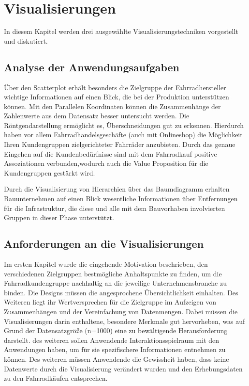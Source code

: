 \documentclass[usegeometry=true]{scrartcl}
\begin{document}
\section{Visualisierungen}
In diesem Kapitel werden drei ausgewählte Visualisierungstechniken vorgestellt und diskutiert.
\subsection{Analyse der Anwendungsaufgaben}
Über den Scatterplot erhält besonders die Zielgruppe der Fahrradhersteller wichtige Informationen auf einen Blick, die bei der Produktion unterstützen können. 
Mit den Parallelen Koordinaten können die Zusammenhänge der Zahlenwerte aus dem Datensatz besser untersucht werden. Die Röntgendarstellung ermöglicht es, Überschneidungen gut zu erkennen. Hierdurch haben vor allem Fahrradhandelsgeschäfte (auch mit Onlineshop) die Möglichkeit Ihren Kundengruppen zielgerichteter Fahrräder anzubieten.
Durch das genaue Eingehen auf die Kundenbedürfnisse sind mit dem Fahrradkauf positive Assoziationen verbunden,wodurch auch die Value Proposition für die Kundengruppen gestärkt wird. 

Durch die Visualisierung von Hierarchien über das Baumdiagramm erhalten Bauunternehmen auf einen Blick wesentliche Informationen über Entfernungen für die Infrastruktur, die diese und alle mit dem Bauvorhaben involvierten Gruppen in dieser Phase unterstützt.

\subsection{Anforderungen an die Visualisierungen}
Im ersten Kapitel wurde die eingehende Motivation beschrieben, den verschiedenen Zielgruppen bestmögliche Anhaltspunkte zu finden, um die Fahrradkundengruppe nachhaltig an die jeweilige Unternehmensbranche zu binden. Die Designs müssen die angesprochene Übersichtlichkeit einhalten. Des Weiteren liegt ihr Wertversprechen für die Zielgruppe im Aufzeigen von Zusammenhängen und der Vereinfachung von Datenmengen. Dabei müssen die Visualisierungen darin enthaltene, besondere Merkmale gut hervorheben, was auf Grund der Datensatzgröße (n=1000) eine zu bewältigende  Herausforderung darstellt. des weiteren sollen Anwendende Interaktionsspielraum mit den Anwendungen haben, um für sie spezifischere Informationen entnehmen zu können. Des weiteren müssen Anwendende die Gewissheit haben, dass keine Datenwerte durch die Visualisierung verändert wurden und den Erhebungsdaten zu den Fahrradkäufen entsprechen. 
\end{document}
